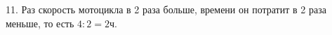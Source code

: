 11. Раз скорость мотоцикла в 2 раза больше, времени он потратит в 2 раза меньше, то есть $4:2=2$ч.\\
